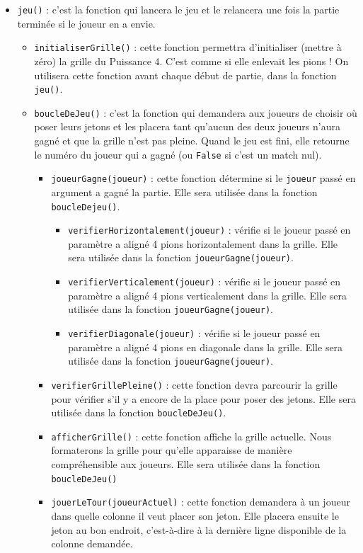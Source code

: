 \documentclass[11pt]{article}
\begin{document}
\begin{itemize}
\item \texttt{jeu()} : c'est la fonction qui lancera le jeu et le relancera une fois la partie terminée si le joueur en a envie.
\begin{itemize}
\item \texttt{initialiserGrille()} : cette fonction permettra d'initialiser (mettre à zéro) la grille du Puissance 4. C'est comme si elle enlevait les pions ! On utilisera cette fonction avant chaque début de partie, dans la fonction \texttt{jeu()}.
\item \texttt{boucleDeJeu()} : c'est la fonction qui demandera aux joueurs de choisir où poser leurs jetons et les placera tant qu'aucun des deux joueurs n'aura gagné et que la grille n'est pas pleine. Quand le jeu est fini, elle retourne le numéro du joueur qui a gagné (ou \texttt{False} si c'est un match nul).
\begin{itemize}
\item \texttt{joueurGagne(joueur)} : cette fonction détermine si le \texttt{joueur} passé en argument a gagné la partie. Elle sera utilisée dans la fonction \texttt{boucleDejeu()}.
\begin{itemize}
\item \texttt{verifierHorizontalement(joueur)} : vérifie si le joueur passé en paramètre a aligné 4 pions horizontalement dans la grille. Elle sera utilisée dans la fonction \texttt{joueurGagne(joueur)}.
\item \texttt{verifierVerticalement(joueur)} : vérifie si le joueur passé en paramètre a aligné 4 pions verticalement dans la grille. Elle sera utilisée dans la fonction \texttt{joueurGagne(joueur)}.
\item \texttt{verifierDiagonale(joueur)} : vérifie si le joueur passé en paramètre a aligné 4 pions en diagonale dans la grille. Elle sera utilisée dans la fonction \texttt{joueurGagne(joueur)}.
\end{itemize}
\item \texttt{verifierGrillePleine()} : cette fonction devra parcourir la grille pour vérifier s'il y a encore de la place pour poser des jetons.
Elle sera utilisée dans la fonction \texttt{boucleDeJeu()}.
\item \texttt{afficherGrille()} : cette fonction affiche la grille actuelle. Nous formaterons la grille pour qu'elle apparaisse de manière compréhensible aux joueurs.
Elle sera utilisée dans la fonction \texttt{boucleDeJeu()}
\item \texttt{jouerLeTour(joueurActuel)} : cette fonction demandera à un joueur dans quelle colonne il veut placer son jeton. Elle placera ensuite le jeton au bon endroit, c'est-à-dire à la dernière ligne disponible de la colonne demandée.

\end{itemize}
\end{itemize}
\end{itemize}
\end{document}
